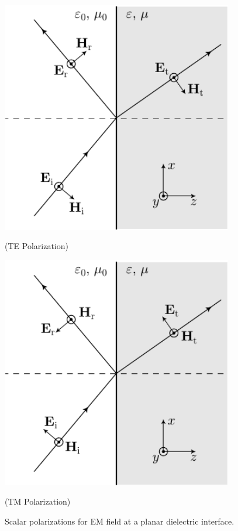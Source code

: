 \begin{figure}
  \begin{minipage}{0.5\linewidth}
  \centering

  \includegraphics[width=0.9\textwidth]{fig/analytical/kvectorTE}

  (TE Polarization)
\end{minipage}
\begin{minipage}{0.5\linewidth}
  \centering

  \includegraphics[width=0.9\textwidth]{fig/analytical/kvectorTM}

  (TM Polarization)
\end{minipage}
\caption[Scalar polarizations at planar interface]{Scalar polarizations for EM field at a planar 
    dielectric interface.}
  \label{fig:planar}
\end{figure}


